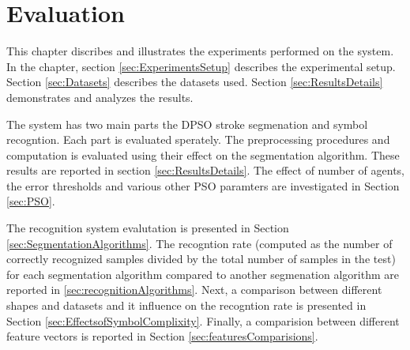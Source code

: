 
\chapter{Evaluation}
\label{sec:Evaluation}
This chapter discribes and illustrates the experiments performed on the system. In the chapter, section \ref{sec:ExperimentsSetup} describes the experimental setup. Section \ref{sec:Datasets} describes the datasets used. Section \ref{sec:ResultsDetails} demonstrates and analyzes the results. 

The system has two main parts the DPSO stroke segmenation and symbol recogntion. Each part is evaluated sperately. The preprocessing procedures and computation is evaluated using their effect on the segmentation algorithm. These results are reported in section \ref{sec:ResultsDetails}. The effect of number of agents, the error thresholds and various other PSO paramters are investigated in Section \ref{sec:PSO}. %

The recognition system evalutation is presented in Section \ref{sec:SegmentationAlgorithms}. The recogntion rate (computed as the number of correctly recognized samples divided by the total number of samples in the test) for each segmentation algorithm compared to another segmenation algorithm are reported in \ref{sec:recognitionAlgorithms}. Next, a comparison between different shapes and datasets and it influence on the recogntion rate is presented in Section \ref{sec:EffectsofSymbolComplixity}. Finally, a  comparision between different feature vectors is reported in Section \ref{sec:featuresComparisions}.

